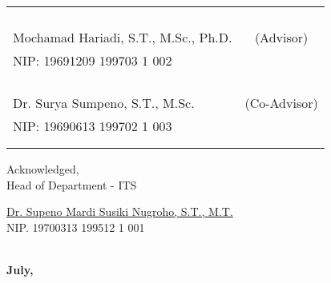 \noindent
\begin{tabularx}{\textwidth}{X c}
  &  \\
  &  \\
  &  \\
  &  \\
  Mochamad Hariadi, S.T., M.Sc., Ph.D.        & (Advisor) \\
  NIP: 19691209 199703 1 002        & \\
  &  \\
  &  \\ 
  &  \\
  &  \\
  Dr. Surya Sumpeno, S.T., M.Sc.     & (Co-Advisor) \\
  NIP: 19690613 199702 1 003       & \\
  &  \\
  &  \\
\end{tabularx}
\endgroup


\begin{center}
  Acknowledged, \\
  Head of \engdepartment{} Department \engfacultyshort{} - ITS \\

  \vspace{8ex}

  \underline{Dr. Supeno Mardi Susiki Nugroho, S.T., M.T.} \\
  NIP. 19700313 199512 1 001
\end{center}

\begin{center}
  \textbf{\MakeUppercase{\place{}}\\July, \the\year{}}
\end{center}
\endgroup
